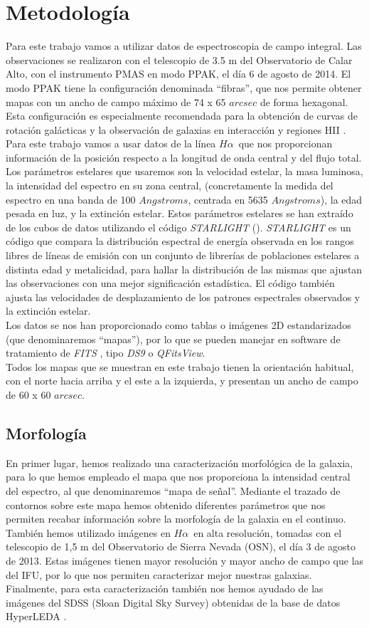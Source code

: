 \documentclass{article}
\newcommand{\hal}{$H\alpha$}
\begin{document}
\section{Metodología}
Para este trabajo vamos a utilizar datos de espectroscopia de campo integral. Las observaciones se realizaron con el telescopio de 3.5 m del Observatorio de Calar Alto, con el instrumento PMAS  en modo PPAK, el día 6 de agosto de 2014. El modo PPAK tiene la configuración denominada ``fibras'', que nos permite obtener mapas con un ancho de campo máximo de 74 x 65 $arcsec$ de forma hexagonal. Esta configuración es especialmente recomendada para la obtención de curvas de rotación galácticas y la observación de galaxias en interacción y regiones HII \cite{Barden}.\\Para este trabajo vamos a usar datos de la línea \hal\ que nos proporcionan información de la posición respecto a la longitud de onda central y del flujo total. Los parámetros estelares que usaremos son la velocidad estelar, la masa luminosa, la intensidad del espectro en su zona central, (concretamente la medida del espectro en una banda de 100 $Angstroms$, centrada en 5635 $Angstroms$), la edad pesada en luz, y la extinción estelar. Estos parámetros estelares se han extraído de los cubos de datos utilizando el código \emph{STARLIGHT} (\cite{Fernandes2005}). \emph{STARLIGHT} es un código que compara la distribución espectral de energía observada en los rangos libres de líneas de emisión con un conjunto de librerías de poblaciones estelares a distinta edad y metalicidad, para hallar la distribución de las mismas que ajustan las observaciones con una mejor significación estadística. El código también ajusta las velocidades de desplazamiento de los patrones espectrales observados y la extinción estelar.\\Los datos se nos han proporcionado como tablas o imágenes 2D estandarizados (que denominaremos ``mapas''), por lo que se pueden manejar en software de tratamiento de \emph{FITS} , tipo \emph{DS9} o \emph{QFitsView}.\\Todos los mapas que se muestran en este trabajo tienen la orientación habitual, con el norte hacia arriba y el este a la izquierda, y presentan un ancho de campo de 60 x 60 $arcsec$.
\subsection{Morfología}
En primer lugar, hemos realizado una caracterización morfológica de la galaxia, para lo que hemos empleado el mapa que nos proporciona la intensidad central del espectro, al que denominaremos ``mapa de señal''. Mediante el trazado de contornos sobre este mapa hemos obtenido diferentes parámetros que nos permiten recabar información sobre la morfología de la galaxia en el continuo. También hemos utilizado imágenes en \hal\ en alta resolución, tomadas con el telescopio de 1,5 m del Observatorio de Sierra Nevada (OSN), el día 3 de agosto de 2013. Estas imágenes tienen mayor resolución y mayor ancho de campo que las del IFU, por lo que nos permiten caracterizar mejor nuestras galaxias. Finalmente, para esta caracterización también nos hemos ayudado de las imágenes del SDSS (Sloan Digital Sky Survey) obtenidas de la base de datos HyperLEDA \cite{Makarov2014}.
\end{document}
